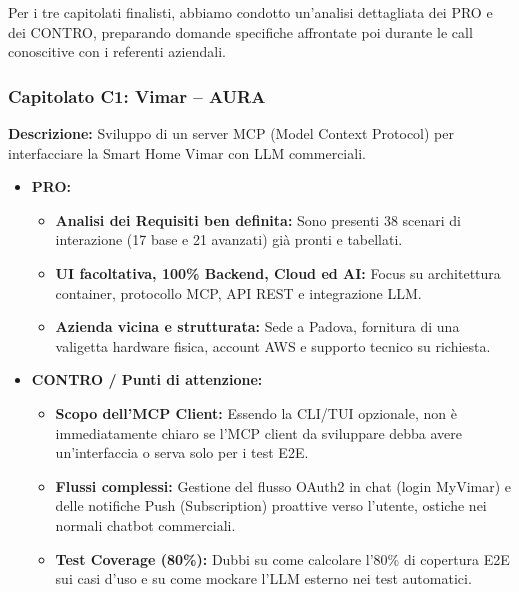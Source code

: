 \documentclass[a4paper, 11pt]{article}
\begin{document}
Per i tre capitolati finalisti, abbiamo condotto un'analisi dettagliata dei PRO e dei CONTRO, preparando domande specifiche affrontate poi durante le call conoscitive con i referenti aziendali.

\subsubsection*{Capitolato C1: Vimar -- AURA}
\textbf{Descrizione:} Sviluppo di un server MCP (Model Context Protocol) per interfacciare la Smart Home Vimar con LLM commerciali.
\begin{itemize}
    \item \textbf{PRO:}
    \begin{itemize}
        \item \textbf{Analisi dei Requisiti ben definita:} Sono presenti 38 scenari di interazione (17 base e 21 avanzati) già pronti e tabellati.
        \item \textbf{UI facoltativa, 100\% Backend, Cloud ed AI:} Focus su architettura container, protocollo MCP, API REST e integrazione LLM.
        \item \textbf{Azienda vicina e strutturata:} Sede a Padova, fornitura di una valigetta hardware fisica, account AWS e supporto tecnico su richiesta.
    \end{itemize}
    \item \textbf{CONTRO / Punti di attenzione:}
    \begin{itemize}
        \item \textbf{Scopo dell'MCP Client:} Essendo la CLI/TUI opzionale, non è immediatamente chiaro se l'MCP client da sviluppare debba avere un'interfaccia o serva solo per i test E2E.
        \item \textbf{Flussi complessi:} Gestione del flusso OAuth2 in chat (login MyVimar) e delle notifiche Push (Subscription) proattive verso l'utente, ostiche nei normali chatbot commerciali.
        \item \textbf{Test Coverage (80\%):} Dubbi su come calcolare l'80\% di copertura E2E sui casi d'uso e su come mockare l'LLM esterno nei test automatici.
    \end{itemize}
\end{itemize}
\end{document}
